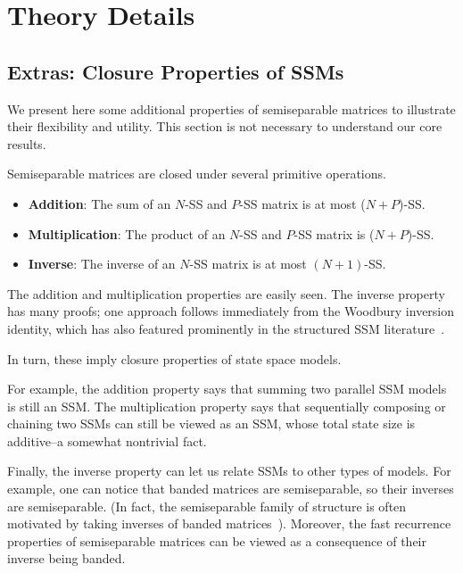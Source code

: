 \section{Theory Details}

\subsection{Extras: Closure Properties of SSMs}
\label{sec:ssm:properties}

%

%

We present here some additional properties of semiseparable matrices to illustrate their flexibility and utility.
This section is not necessary to understand our core results.

\begin{proposition}
  \label{prop:ss-closure}
  Semiseparable matrices are closed under several primitive operations.
  \begin{itemize}
    \item \textbf{Addition}: The sum of an $N$-SS and $P$-SS matrix is at most ($N+P$)-SS.
    \item \textbf{Multiplication}: The product of an $N$-SS and $P$-SS matrix is ($N+P$)-SS.
    \item \textbf{Inverse}: The inverse of an $N$-SS matrix is at most $(N+1)$-SS.
  \end{itemize}
\end{proposition}
The addition and multiplication properties are easily seen.
The inverse property has many proofs; one approach follows immediately from the Woodbury inversion identity, which has also featured prominently in the structured SSM literature~\citep{gu2022efficiently}.
%
%


In turn, these imply closure properties of state space models.

For example, the addition property says that summing two parallel SSM models is still an SSM.
The multiplication property says that sequentially composing or chaining two SSMs can still be viewed as an SSM, whose total state size is additive--a somewhat nontrivial fact.

Finally, the inverse property can let us relate SSMs to other types of models. For example,
one can notice that banded matrices are semiseparable, so their inverses are semiseparable.
(In fact, the semiseparable family of structure is often motivated by taking inverses of banded matrices~\citep{vandebril2005bibliography}).
Moreover, the fast recurrence properties of semiseparable matrices can be viewed as a consequence of their inverse being banded.

